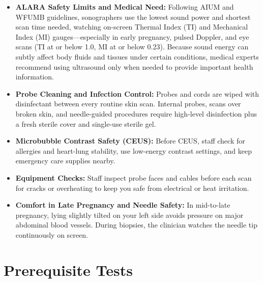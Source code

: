 \begin{itemize}
    \item \textbf{ALARA Safety Limits and Medical Need:} Following AIUM and WFUMB guidelines, sonographers use the lowest sound power and shortest scan time needed, watching on-screen Thermal Index (TI) and Mechanical Index (MI) gauges---especially in early pregnancy, pulsed Doppler, and eye scans (TI at or below 1.0, MI at or below 0.23). Because sound energy can subtly affect body fluids and tissues under certain conditions, medical experts recommend using ultrasound only when needed to provide important health information.
    \item \textbf{Probe Cleaning and Infection Control:} Probes and cords are wiped with disinfectant between every routine skin scan. Internal probes, scans over broken skin, and needle-guided procedures require high-level disinfection plus a fresh sterile cover and single-use sterile gel.
    \item \textbf{Microbubble Contrast Safety (CEUS):} Before CEUS, staff check for allergies and heart-lung stability, use low-energy contrast settings, and keep emergency care supplies nearby.
    \item \textbf{Equipment Checks:} Staff inspect probe faces and cables before each scan for cracks or overheating to keep you safe from electrical or heat irritation.
    \item \textbf{Comfort in Late Pregnancy and Needle Safety:} In mid-to-late pregnancy, lying slightly tilted on your left side avoids pressure on major abdominal blood vessels. During biopsies, the clinician watches the needle tip continuously on screen.
\end{itemize}

\section{Prerequisite Tests}

